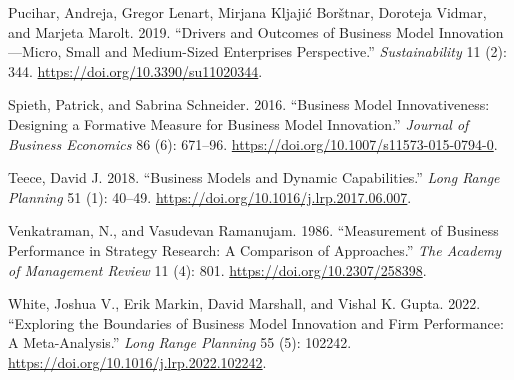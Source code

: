 \documentclass[
]{article}
\newlength{\cslhangindent}
\newenvironment{CSLReferences}[2] %
 {\begin{list}{}{%
  \setlength{\itemindent}{0pt}
  \setlength{\leftmargin}{0pt}
  \setlength{\parsep}{0pt}
  \ifodd #1
   \setlength{\leftmargin}{\cslhangindent}
   \setlength{\itemindent}{-1\cslhangindent}
  \fi
  \setlength{\itemsep}{#2\baselineskip}}}
 {\end{list}}
\begin{document}
\begin{CSLReferences}{1}{0}
Pucihar, Andreja, Gregor Lenart, Mirjana Kljajić Borštnar, Doroteja
Vidmar, and Marjeta Marolt. 2019. {``Drivers and {Outcomes} of
{Business} {Model} {Innovation}---{Micro}, {Small} and {Medium}-{Sized}
{Enterprises} {Perspective}.''} \emph{Sustainability} 11 (2): 344.
\url{https://doi.org/10.3390/su11020344}.

Spieth, Patrick, and Sabrina Schneider. 2016. {``Business Model
Innovativeness: Designing a Formative Measure for Business Model
Innovation.''} \emph{Journal of Business Economics} 86 (6): 671--96.
\url{https://doi.org/10.1007/s11573-015-0794-0}.

Teece, David J. 2018. {``Business Models and Dynamic Capabilities.''}
\emph{Long Range Planning} 51 (1): 40--49.
\url{https://doi.org/10.1016/j.lrp.2017.06.007}.

Venkatraman, N., and Vasudevan Ramanujam. 1986. {``Measurement of
{Business} {Performance} in {Strategy} {Research}: {A} {Comparison} of
{Approaches}.''} \emph{The Academy of Management Review} 11 (4): 801.
\url{https://doi.org/10.2307/258398}.

White, Joshua V., Erik Markin, David Marshall, and Vishal K. Gupta.
2022. {``Exploring the Boundaries of Business Model Innovation and Firm
Performance: {A} Meta-Analysis.''} \emph{Long Range Planning} 55 (5):
102242. \url{https://doi.org/10.1016/j.lrp.2022.102242}.

\end{CSLReferences}
\end{document}
